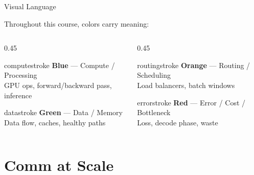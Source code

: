 \documentclass[aspectratio=169, 12pt]{beamer}
\begin{document}
\begin{frame}{Visual Language}

\small
Throughout this course, colors carry meaning:

\vspace{0.3cm}
\begin{columns}[T]
  \begin{column}{0.45\textwidth}
    \begin{mlsyscard}{computestroke}
    \textbf{Blue} --- Compute / Processing\\
    {\footnotesize GPU ops, forward/backward pass, inference}
    \end{mlsyscard}
    \vspace{0.15cm}
    \begin{mlsyscard}{datastroke}
    \textbf{Green} --- Data / Memory\\
    {\footnotesize Data flow, caches, healthy paths}
    \end{mlsyscard}
  \end{column}
  \begin{column}{0.45\textwidth}
    \begin{mlsyscard}{routingstroke}
    \textbf{Orange} --- Routing / Scheduling\\
    {\footnotesize Load balancers, batch windows}
    \end{mlsyscard}
    \vspace{0.15cm}
    \begin{mlsyscard}{errorstroke}
    \textbf{Red} --- Error / Cost / Bottleneck\\
    {\footnotesize Loss, decode phase, waste}
    \end{mlsyscard}
  \end{column}
\end{columns}
\end{frame}



\section{Comm at Scale}
\end{document}
